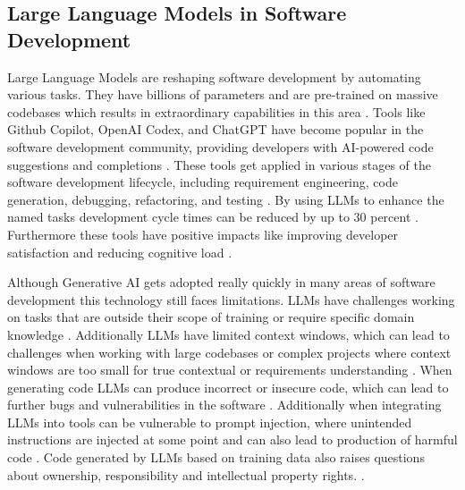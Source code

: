 \subsection{Large Language Models in Software Development}

Large Language Models are reshaping software development by automating various tasks. They have billions of parameters and are pre-trained on massive codebases which results in extraordinary capabilities in this area \cite{chenUnveilingPitfallsUnderstanding2025}. Tools like Github Copilot, OpenAI Codex, and ChatGPT have become popular in the software development community, providing developers with AI-powered code suggestions and completions \cite{bhargavmallampatiRoleGenerativeAI2025}. These tools get applied in various stages of the software development lifecycle, including requirement engineering, code generation, debugging, refactoring, and testing \cite{houLargeLanguageModels2024, puvvadiCodingAgentsComprehensive2025,bhargavmallampatiRoleGenerativeAI2025}. By using LLMs to enhance the named tasks development cycle times can be reduced by up to 30 percent \cite{bhargavmallampatiRoleGenerativeAI2025,kalliamvakouResearchQuantifyingGitHub2022}. Furthermore these tools have positive impacts like improving developer satisfaction and reducing cognitive load \cite{kalliamvakouResearchQuantifyingGitHub2022}.

Although Generative AI gets adopted really quickly in many areas of software development this technology still faces limitations. LLMs have challenges working on tasks that are outside their scope of training or require specific domain knowledge \cite{houLargeLanguageModels2024}. Additionally LLMs have limited context windows, which can lead to challenges when working with large codebases or complex projects where context windows are too small for true contextual or requirements understanding \cite{bhargavmallampatiRoleGenerativeAI2025}. When generating code LLMs can produce incorrect or insecure code, which can lead to further bugs and vulnerabilities in the software \cite{houLargeLanguageModels2024, bhargavmallampatiRoleGenerativeAI2025}. Additionally when integrating LLMs into tools can be vulnerable to prompt injection, where unintended instructions are injected at some point and can also lead to production of harmful code \cite{liuPromptInjectionAttack2024}. Code generated by LLMs based on training data also raises questions about ownership, responsibility and intellectual property rights. \cite{sauvolaFutureSoftwareDevelopment2024, houLargeLanguageModels2024}.

